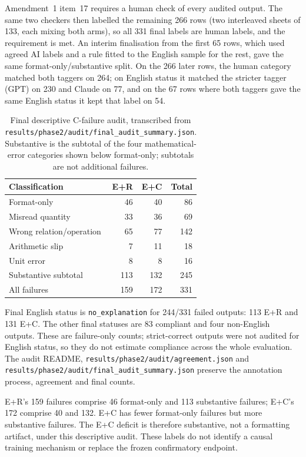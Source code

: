 Amendment~1 item~17 requires a human check of every audited output. The same two checkers then labelled the remaining 266 rows (two interleaved sheets of 133, each mixing both arms), so all 331 final labels are human labels, and the requirement is met. An interim finalisation from the first 65 rows, which used agreed AI labels and a rule fitted to the English sample for the rest, gave the same format-only/substantive split. On the 266 later rows, the human category matched both taggers on 264; on English status it matched the stricter tagger (GPT) on 230 and Claude on 77, and on the 67 rows where both taggers gave the same English status it kept that label on 54.

\begin{table}[H]
\centering\small\singlespacing
\caption{Final descriptive C-failure audit, transcribed from \nolinkurl{results/phase2/audit/final_audit_summary.json}. Substantive is the subtotal of the four mathematical-error categories shown below format-only; subtotals are not additional failures.}
\label{tab:phase2-final-audit}
\begin{tabular}{@{}lrrr@{}}
\toprule
Classification & E+R & E+C & Total\\
\midrule
Format-only & 46 & 40 & 86\\
Misread quantity & 33 & 36 & 69\\
Wrong relation/operation & 65 & 77 & 142\\
Arithmetic slip & 7 & 11 & 18\\
Unit error & 8 & 8 & 16\\
\midrule
Substantive subtotal & 113 & 132 & 245\\
All failures & 159 & 172 & 331\\
\bottomrule
\end{tabular}
\end{table}

Final English status is \texttt{no\_explanation} for 244/331 failed outputs: 113 E+R and 131 E+C. The other final statuses are 83 compliant and four non-English outputs. These are failure-only counts; strict-correct outputs were not audited for English status, so they do not estimate compliance across the whole evaluation. The audit README, \nolinkurl{results/phase2/audit/agreement.json} and \nolinkurl{results/phase2/audit/final_audit_summary.json} preserve the annotation process, agreement and final counts.

E+R's 159 failures comprise 46 format-only and 113 substantive failures; E+C's 172 comprise 40 and 132. E+C has fewer format-only failures but more substantive failures. The E+C deficit is therefore substantive, not a formatting artifact, under this descriptive audit. These labels do not identify a causal training mechanism or replace the frozen confirmatory endpoint.

